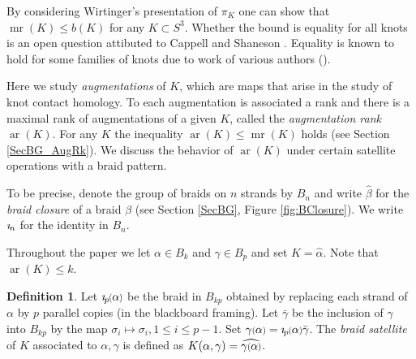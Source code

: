 \documentclass[11pt]{amsart}
\def\s{{\sigma}}
\def\ar{\operatorname{ar}}
\def\mr{\operatorname{mr}}
\newcommand*{\smallp}[1]{\scalebox{.75}{\ensuremath#1}}
\newcommand{\pp}[2][p]{\imath_{\hspace*{-1pt}#1}\hspace*{-.5pt}\smallp(#2\smallp)}
\theoremstyle{definition}
\newtheorem{defn}[thm]{Definition}
\begin{document}
By considering Wirtinger's presentation of $\pi_K$ one can show that $\mr(K)\le b(K)$ for any $K\subset S^3$. Whether the bound is equality for all knots is an open question attibuted to Cappell and Shaneson \cite[Prob. 1.11]{Kir95}. Equality is known to hold for some families of knots due to work of various authors (\cite{BZ,Cor13b,RZ}).

Here we study \emph{augmentations} of $K$, which are maps that arise in the study of knot contact homology. To each augmentation is associated a rank and there is a maximal rank of augmentations of a given $K$, called the \emph{augmentation rank} $\ar(K)$. For any $K$ the inequality $\ar(K)\le \mr(K)$ holds (see Section \ref{SecBG_AugRk}). We discuss the behavior of $\ar(K)$ under certain satellite operations with a braid pattern. 

To be precise, denote the group of braids on $n$ strands by $B_n$ and write $\hat{\beta}$ for the \emph{braid closure} of a braid $\beta$ (see Section \ref{SecBG}, Figure \ref{fig:BClosure}). We write $\imath_{\hspace*{-1pt}n}$ for the identity in $B_n$. 

Throughout the paper we let $\alpha\in B_k$ and $\gamma\in B_p$ and set $K = \hat{\alpha}$. Note that $\ar(K)\le k$.

\begin{defn} Let $\pp\alpha$ be the braid in $B_{kp}$ obtained by replacing each strand of $\alpha$ by $p$ parallel copies (in the blackboard framing). Let $\bar\gamma$ be the inclusion of $\gamma$ into $B_{kp}$ by the map $\s_i\mapsto\s_i, 1\le i\le p-1$. Set $\gamma\smallp(\alpha\smallp) = \pp\alpha\bar\gamma$. The \emph{braid satellite} of $K$ associated to $\alpha, \gamma$ is defined as $K(\alpha,\gamma) = \widehat{\gamma\smallp(\alpha\smallp)}$.
\label{defn:BraidSat}
\end{defn}
\end{document}
